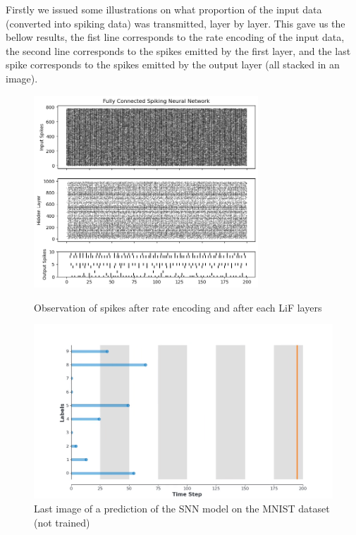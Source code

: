 \documentclass[11pt]{article}
\begin{document}
Firstly we issued some illustrations on what proportion of the input data (converted into spiking data) was transmitted, layer by layer. This gave us the bellow results, the fist line corresponds to the rate encoding of the input data, the second line corresponds to the spikes emitted by the first layer, and the last spike corresponds to the spikes emitted by the output layer (all stacked in an image).
\begin{figure}[H]
  \begin{minipage}{0.5\textwidth}
    \begin{center}
      \includegraphics[width=0.75\textwidth]{image/spikes_simple_snn.png}
      \caption{Observation of spikes after rate encoding and after each LiF layers}
      \label{fig:spikes_snn}
    \end{center}
  \end{minipage}
  \hspace{0.5cm}
  \begin{minipage}{0.5\textwidth}
    \begin{center}
      \includegraphics[width=\textwidth]{image/mnist1_050.png}
      \caption{Last image of a prediction of the SNN model on the MNIST dataset (not trained)}
      \label{fig:mnist1}
    \end{center}
  \end{minipage}
\end{figure}
\end{document}
